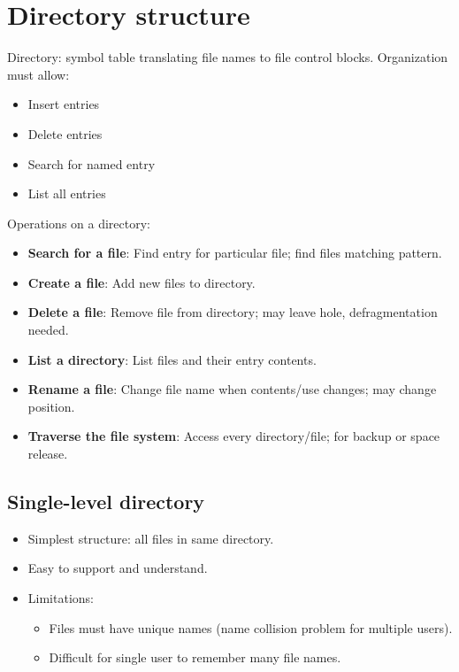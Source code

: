 \section{Directory structure}

Directory: symbol table translating file names to file control blocks.
Organization must allow:
\begin{itemize}
    \item Insert entries
    \item Delete entries
    \item Search for named entry
    \item List all entries
\end{itemize}

Operations on a directory:
\begin{itemize}
    \item \textbf{Search for a file}: Find entry for particular file; find files matching pattern.
    \item \textbf{Create a file}: Add new files to directory.
    \item \textbf{Delete a file}: Remove file from directory; may leave hole, defragmentation needed.
    \item \textbf{List a directory}: List files and their entry contents.
    \item \textbf{Rename a file}: Change file name when contents/use changes; may change position.
    \item \textbf{Traverse the file system}: Access every directory/file; for backup or space release.
\end{itemize}

\subsection{Single-level directory}
\begin{itemize}
    \item Simplest structure: all files in same directory.
    \item Easy to support and understand.
    \item Limitations:
    \begin{itemize}
        \item Files must have unique names (name collision problem for multiple users).
        \item Difficult for single user to remember many file names.
    \end{itemize}
\end{itemize}

